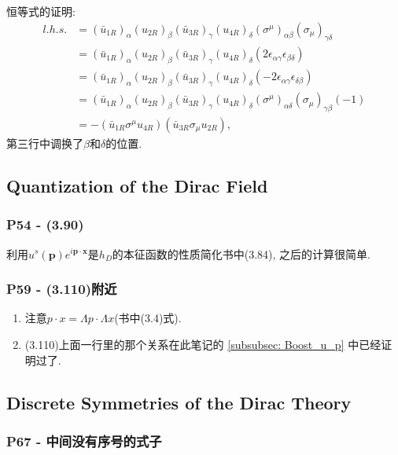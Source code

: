 \documentclass[cn,hazy,blue,11pt,device=normal,chinesefont=founder]{elegantnote}
\begin{document}
恒等式的证明: 
\begin{equation}
  \begin{aligned}
    l.h.s. &= (\bar{u}_{1R})_\alpha (u_{2R})_\beta (\bar{u}_{3R})_\gamma (u_{4R})_\delta (\sigma^{\mu})_{\alpha\beta} (\sigma_{\mu})_{\gamma\delta} \\
    &= (\bar{u}_{1R})_\alpha (u_{2R})_\beta (\bar{u}_{3R})_\gamma (u_{4R})_\delta (2\epsilon_{\alpha\gamma} \epsilon_{\beta\delta}) \\
    &= (\bar{u}_{1R})_\alpha (u_{2R})_\beta (\bar{u}_{3R})_\gamma (u_{4R})_\delta (-2\epsilon_{\alpha\gamma} \epsilon_{\delta\beta}) \\
    &= (\bar{u}_{1R})_\alpha (u_{2R})_\beta (\bar{u}_{3R})_\gamma (u_{4R})_\delta (\sigma^{\mu})_{\alpha\delta} (\sigma_{\mu})_{\gamma\beta} (-1) \\
    &= -(\bar{u}_{1R} \sigma^{\mu} u_{4R})(\bar{u}_{3R} \sigma_{\mu} u_{2R}), 
  \end{aligned}
\end{equation}
第三行中调换了$\beta$和$\delta$的位置. 

\subsection{Quantization of the Dirac Field}

\subsubsection{P54 - (3.90)}

利用$u^s(\mathbf{p})e^{i\mathbf{p} \cdot \mathbf{x}}$是$h_D$的本征函数的性质简化书中(3.84), 之后的计算很简单. 

\subsubsection{P59 - (3.110)附近}
\begin{enumerate}
  \item 注意$p\cdot x = \Lambda p\cdot \Lambda x$(书中(3.4)式).
  \item (3.110)上面一行里的那个关系在此笔记的 \ref{subsubsec: Boost_u_p} 中已经证明过了. 
\end{enumerate}

\subsection{Discrete Symmetries of the Dirac Theory}

\subsubsection{P67 - 中间没有序号的式子} 
\end{document}
